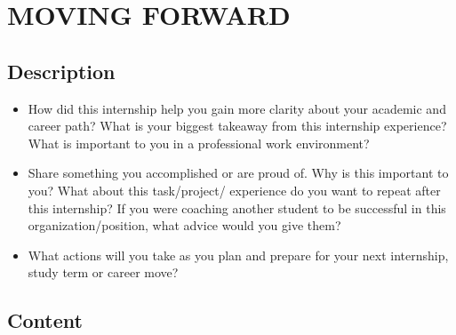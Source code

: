 \newpage
\section{MOVING FORWARD}

\subsection{Description}

\begin{itemize}
    \item How did this internship help you gain more clarity about your academic and career path? What is your biggest takeaway from this internship experience? What is important to you in a professional work environment?
    \item Share something you accomplished or are proud of. Why is this important to you? What about this task/project/ experience do you want to repeat after this internship? If you were coaching another student to be successful in this organization/position, what advice would you give them?
    \item What actions will you take as you plan and prepare for your next internship, study term or career move? 
\end{itemize}


\subsection{Content}
